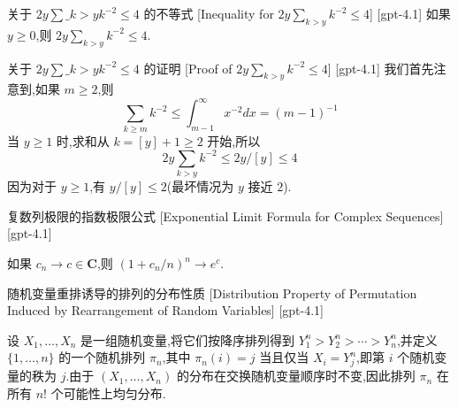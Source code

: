 \documentclass[UTF8]{ctexart}
\begin{document}
    
    
    \begin{thm}
        {关于 $2y \sum\_{k > y} k^{-2} \leq 4$ 的不等式}
        [Inequality for $2y \sum_{k > y} k^{-2} \leq 4$]
        [gpt-4.1]
        如果 $y \geq 0$,则 $2y \sum_{k > y} k^{-2} \leq 4$.
    \end{thm}
    
    
    
    \begin{prf}
        {关于 $2y \sum\_{k > y} k^{-2} \leq 4$ 的证明}
        [Proof of $2y \sum_{k > y} k^{-2} \leq 4$]
        [gpt-4.1]
        我们首先注意到,如果 $m \geq 2$,则
\[
\sum_{k \geq m} k^{-2} \leq \int_{m-1}^{\infty} x^{-2} dx = (m-1)^{-1}
\]
当 $y \geq 1$ 时,求和从 $k = [y] + 1 \geq 2$ 开始,所以
\[
2y \sum_{k > y} k^{-2} \leq 2y/[y] \leq 4
\]
因为对于 $y \geq 1$,有 $y/[y] \leq 2$(最坏情况为 $y$ 接近 $2$).

    \end{prf}
    
    
    
    \begin{thm}
        {复数列极限的指数极限公式}
        [Exponential Limit Formula for Complex Sequences]
        [gpt-4.1]
        
如果 $c_n \to c \in \mathbf{C}$,则 $(1 + c_n / n)^n \to e^c$.

    \end{thm}
    
    
    
    \begin{ppt}
        {随机变量重排诱导的排列的分布性质}
        [Distribution Property of Permutation Induced by Rearrangement of Random Variables]
        [gpt-4.1]
        
设 $X_1, \ldots, X_n$ 是一组随机变量,将它们按降序排列得到 $Y_1^n > Y_2^n > \cdots > Y_n^n$,并定义 $\{1, \ldots, n\}$ 的一个随机排列 $\pi_n$,其中 $\pi_n(i) = j$ 当且仅当 $X_i = Y_j^n$,即第 $i$ 个随机变量的秩为 $j$.由于 $(X_1, \ldots, X_n)$ 的分布在交换随机变量顺序时不变,因此排列 $\pi_n$ 在所有 $n!$ 个可能性上均匀分布.

    \end{ppt}
    
    
    
\end{document}
